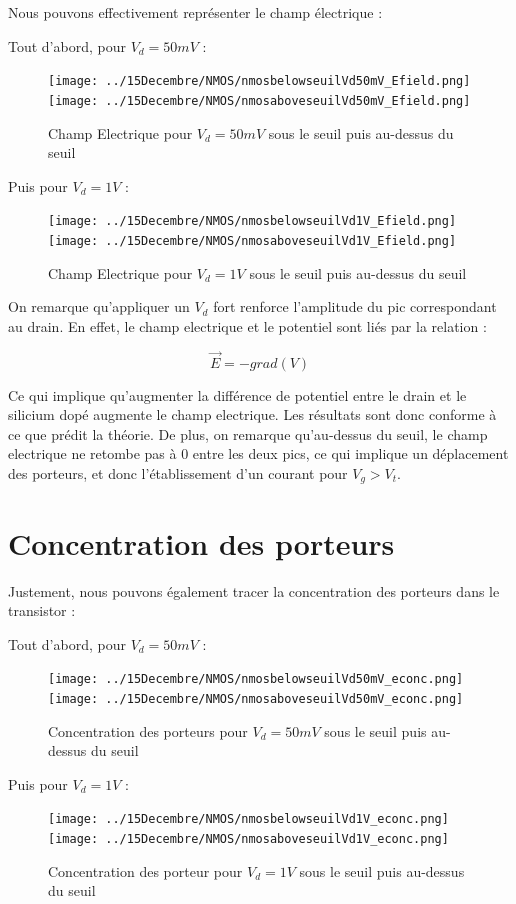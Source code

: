 \documentclass[a4paper,11pt]{report}
\begin{document}
Nous pouvons effectivement représenter le champ électrique :

Tout d'abord, pour $V_d=50mV$ :
\begin{figure}[H]
\centering
\texttt{[image: ../15Decembre/NMOS/nmosbelowseuilVd50mV\_Efield.png]} 
\texttt{[image: ../15Decembre/NMOS/nmosaboveseuilVd50mV\_Efield.png]}
\caption{Champ Electrique pour $V_d=50mV$ sous le seuil puis au-dessus du seuil}
\end{figure}

Puis pour $V_d=1V$ :

\begin{figure}[H]
\centering
\texttt{[image: ../15Decembre/NMOS/nmosbelowseuilVd1V\_Efield.png]} 
\texttt{[image: ../15Decembre/NMOS/nmosaboveseuilVd1V\_Efield.png]}
\caption{Champ Electrique pour $V_d=1V$ sous le seuil puis au-dessus du seuil}
\end{figure}

On remarque qu'appliquer un $V_d$ fort renforce l'amplitude du pic correspondant au drain. En effet, le champ electrique et le potentiel sont liés par la relation :

\[\vec{E}=-grad(V)\]

Ce qui implique qu'augmenter la différence de potentiel entre le drain et le silicium dopé augmente le champ electrique. Les résultats sont donc conforme à ce que prédit la théorie. De plus, on remarque qu'au-dessus du seuil, le champ electrique ne retombe pas à 0 entre les deux pics, ce qui implique un déplacement des porteurs, et donc l'établissement d'un courant pour $V_g>V_t$.
\vspace{0.5cm}

\section{Concentration des porteurs}

Justement, nous pouvons également tracer la concentration des porteurs dans le transistor :

Tout d'abord, pour $V_d=50mV$ :
\begin{figure}[H]
\centering
\texttt{[image: ../15Decembre/NMOS/nmosbelowseuilVd50mV\_econc.png]} 
\texttt{[image: ../15Decembre/NMOS/nmosaboveseuilVd50mV\_econc.png]}
\caption{Concentration des porteurs pour $V_d=50mV$ sous le seuil puis au-dessus du seuil}
\end{figure}

Puis pour $V_d=1V$ :

\begin{figure}[H]
\centering
\texttt{[image: ../15Decembre/NMOS/nmosbelowseuilVd1V\_econc.png]} 
\texttt{[image: ../15Decembre/NMOS/nmosaboveseuilVd1V\_econc.png]}
\caption{Concentration des porteur pour $V_d=1V$ sous le seuil puis au-dessus du seuil}
\end{figure}
\end{document}
